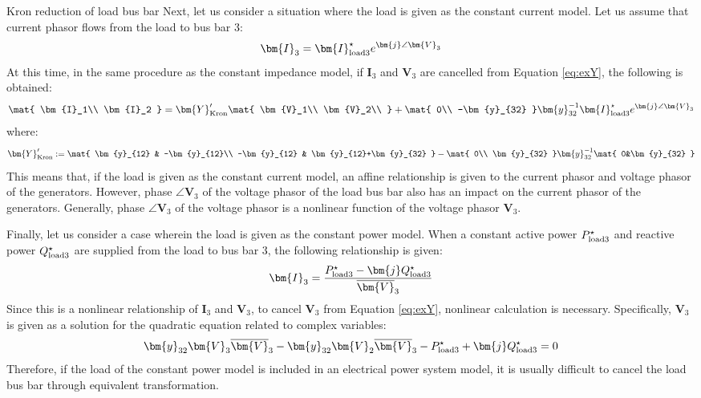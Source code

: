 \documentclass[graybox, envcountchap]{svmult}
\begin{document}
\begin{example}{Kron reduction of load bus bar}
Next, let us consider a situation where the load is given as the constant current model.
Let us assume that current phasor flows from the load to bus bar 3:
\[
\bm{I}_3 = \bm{I}_{{\rm load}3}^{\star} e^{\bm{j} \angle \bm{V}_3}
\]
At this time, in the same procedure as the constant impedance model, if $\bm{I}_3$ and $\bm{V}_3$ 
are cancelled from Equation \ref{eq:exY}, the following is obtained:
\begin{align*}
\mat{
\bm{I}_1\\
\bm{I}_2
}
=
\bm{Y}_{\rm Kron}'
\mat{
\bm{V}_1\\
\bm{V}_2\\
}
+
\mat{
0\\
-\bm{y}_{32}
}
\bm{y}_{32}^{-1}
\bm{I}_{{\rm load}3}^{\star} e^{\bm{j} \angle \bm{V}_3}
\end{align*}
where:
\[
\bm{Y}_{\rm Kron}' :=
\mat{
\bm{y}_{12} & -\bm{y}_{12}\\
-\bm{y}_{12} & \bm{y}_{12}+\bm{y}_{32}
}
-
\mat{
0\\
\bm{y}_{32}
}
\bm{y}_{32}^{-1}
\mat{
0&\bm{y}_{32}
}
\]
This means that, if the load is given as the constant current model, an affine relationship is given to the current phasor and voltage phasor of the generators.
However, phase $\angle \bm{V}_3$ of the voltage phasor of the load bus bar also has an impact on the current phasor of the generators.
Generally, phase $\angle \bm{V}_3$ of the voltage phasor is a nonlinear function of the voltage phasor $\bm{V}_3$.


Finally, let us consider a case wherein the load is given as the constant power model.
When a constant active power $P_{{\rm load}3}^{\star}$ and reactive power $Q_{{\rm load}3}^{\star}$ are supplied from the load to bus bar 3, the following relationship is given:
\begin{align*}
\bm{I}_3 = \frac{P_{{\rm load}3}^{\star} - \bm{j} Q_{{\rm load}3}^{\star} }{\overline{\bm{V}}_3}
\end{align*}
Since this is a nonlinear relationship of $\bm{I}_3$ and $\bm{V}_3$, to cancel $\bm{V}_3$ from Equation \ref{eq:exY}, nonlinear calculation is necessary.
Specifically, $\bm{V}_3$ is given as a solution for the quadratic equation related to complex variables:
\begin{align*}
\bm{y}_{32} \bm{V}_3 \overline{\bm{V}}_3 - \bm{y}_{32}  \bm{V}_2 \overline{\bm{V}}_3 -P_{{\rm load}3}^{\star} 
+ \bm{j} Q_{{\rm load}3}^{\star} =0
\end{align*}
Therefore, if the load of the constant power model is included in an electrical power system model, it is usually difficult to cancel the load bus bar through equivalent transformation.
\end{example}
\end{document}

